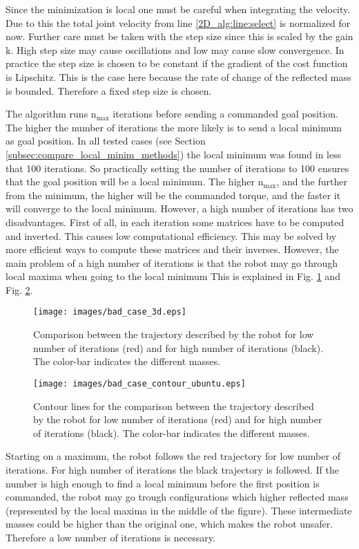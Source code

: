 Since the minimization is local one must be careful when integrating the velocity. Due to this the total joint velocity from  line \ref{2D_alg:line:select} is normalized for now. Further care must be taken with the step size since this is scaled by the gain $\mathrm{k}$. High step size may cause oscillations and low may cause slow convergence.  In practice the step size is chosen to be constant if the gradient of the cost function is Lipschitz. This is the case here because the rate of change of the reflected mass is bounded. Therefore a fixed step size is chosen.

The algorithm runs $\mathrm{n_{max}}$ iterations before sending a commanded goal position. 
The higher the number of iterations the more likely is to send a local minimum as goal position. In all tested cases (see Section   \ref{subsec:compare_local_minim_methods})  the local minimum was found in less that 100 iterations. So practically setting the number of iterations to 100 ensures that the goal position will be a local minimum. The higher $\mathrm{n_{max}}$, and the further from the minimum, the higher will be the commanded torque, and the faster it will converge to the local minimum.
However, a high number of iterations has two disadvantages. First of all, in each iteration some matrices have to be computed and inverted. This causes low computational efficiency. This may be solved by more efficient ways to compute these matrices and their inverses. However, the main problem of a high number of iterations is that the robot may go through local maxima when going to the local minimum This is explained in Fig. \ref{fig:bad_case_3d} and Fig. \ref{fig:bad_case_contour}.\\
%
\begin{figure}[H]
	\centerline{
		\texttt{[image: images/bad\_case\_3d.eps]}}
	\caption{Comparison between the trajectory described by the robot for low number of iterations (red) and for high number of iterations (black). The color-bar indicates the different masses.}
	\label{fig:bad_case_3d}
\end{figure}
\begin{figure}[H]
	\centerline{
		\texttt{[image: images/bad\_case\_contour\_ubuntu.eps]}}
	\caption{Contour lines for the comparison between the trajectory described by the robot for low number of iterations (red) and for high number of iterations (black). The color-bar indicates the different masses.}
	\label{fig:bad_case_contour}
\end{figure}
%
Starting on a maximum, the robot  follows the red trajectory for low number of iterations. For high number of iterations the black trajectory is followed. If the number is high enough to find a local minimum before the first position is commanded, the robot may go trough configurations which higher reflected mass (represented by the local maxima in the middle of the figure). These intermediate masses could be higher than the original one, which makes the robot unsafer. Therefore a low number of iterations is necessary.
